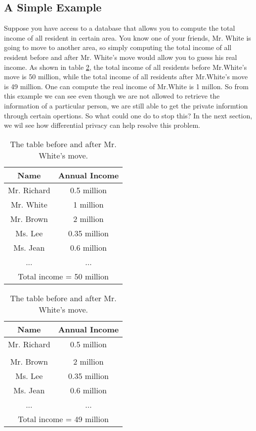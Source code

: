 \documentclass[a4paper, 11pt]{article} %
\theoremstyle{definition}
\begin{document}
\subsection{A Simple Example}
Suppose you have access to a database that allows you to compute the total income of all resident in certain area. You know one of your friends, Mr. White is going to move to another area, so simply computing the total income of all resident before and after Mr. White's move would allow you to guess his real income. As shown in table \ref{table:1}, the total income of all residents before Mr.White's move is 50 million, while the total income of all residents after Mr.White's move is 49 million. One can compute the real income of Mr.White is 1 millon. So from this example we can see even though we are not allowed to retrieve the information of a particular person, we are still able to get the private informtion through certain opertions. So what could one do to stop this? In the next section, we wil see how differential privacy can help resolve this problem.


\begin{table}
	\begin{tabular}{||c||c||} 
		\hline
		Name & Annual Income  \\ [0.5ex] 
		\hline\hline
		Mr. Richard & 0.5 million  \\ 
		\hline
		Mr. White & 1 million \\
		\hline
		Mr. Brown & 2 million \\
		\hline
		Ms. Lee & 0.35 million \\
		\hline
		Ms. Jean & 0.6 million \\
		\hline
		... & ...  \\
		\hline
		\multicolumn{2}{||c||}{Total income = 50 million}\\
		\hline
	\end{tabular}
\quad\quad
\begin{tabular}{||c || c||} 
	\hline
	Name & Annual Income  \\ [0.5ex] 
	\hline\hline
	Mr. Richard & 0.5 million  \\ 
	\hline
      &  \\
	\hline
	Mr. Brown & 2 million \\
	\hline
	Ms. Lee & 0.35 million \\
	\hline
	Ms. Jean & 0.6 million \\
	\hline
	... & ...  \\
	\hline
	\multicolumn{2}{||c||}{Total income = 49 million}\\
	\hline
\end{tabular}
	\caption{The table before and after Mr. White's move. }
	\label{table:1}
\end{table}
\end{document}
